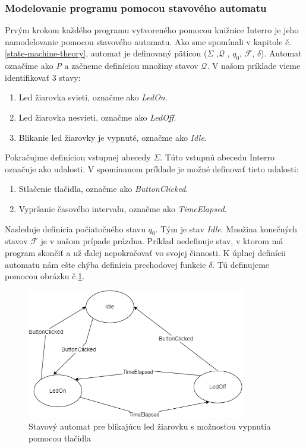 \subsubsection{Modelovanie programu pomocou stavového automatu}
\noindent \par
Prvým krokom každého programu vytvoreného pomocou knižnice Interro je jeho namodelovanie pomocou stavového automatu.
Ako sme spomínali v kapitole č.\ref{state-machine-theory}, automat je definovaný päticou ($\Sigma$ ,$\mathcal{Q}$ , $q_0$, $\mathcal{F}$, $\delta$).
Automat označíme ako \textit{P} a začneme definíciou množiny stavov $\mathcal{Q}$. V našom príklade vieme identifikovať 3 stavy:
\begin{enumerate}
    \item Led žiarovka svieti, označme ako \textit{LedOn}.
    \item Led žiarovka nesvieti, označme ako \textit{LedOff}.
    \item Blikanie led žiarovky je vypnuté, označme ako \textit{Idle}.
\end{enumerate}

Pokračujme definíciou vstupnej abecedy $\Sigma$. Túto vstupnú abecedu Interro označuje ako udalosti. V spomínanom príklade je možné definovať tieto udalosti:
\begin{enumerate}
    \item Stlačenie tlačidla, označme ako \textit{ButtonClicked}.
    \item Vypršanie časového intervalu, označme ako \textit{TimeElapsed}.
\end{enumerate}

Nasleduje definícia počiatočného stavu $q_0$. Tým je stav \textit{Idle}. Množina konečných stavov $\mathcal{F}$ je v našom prípade prázdna. Príklad nedefinuje
stav, v ktorom má program skončiť a už ďalej nepokračovať vo svojej činnosti. K úplnej definícii automatu nám ešte chýba definícia prechodovej funkcie $\delta$.
Tú definujeme pomocou obrázku č.\ref{figure:blinking-led-state-machine}.

\begin{figure}[!h]
    \centering
    \includegraphics[width=0.85\textwidth]{img/blinking-led-state-machine.png}
    \caption{Stavový automat pre blikajúcu led žiarovku s možnosťou vypnutia pomocou tlačidla}
    \label{figure:blinking-led-state-machine}
\end{figure}


